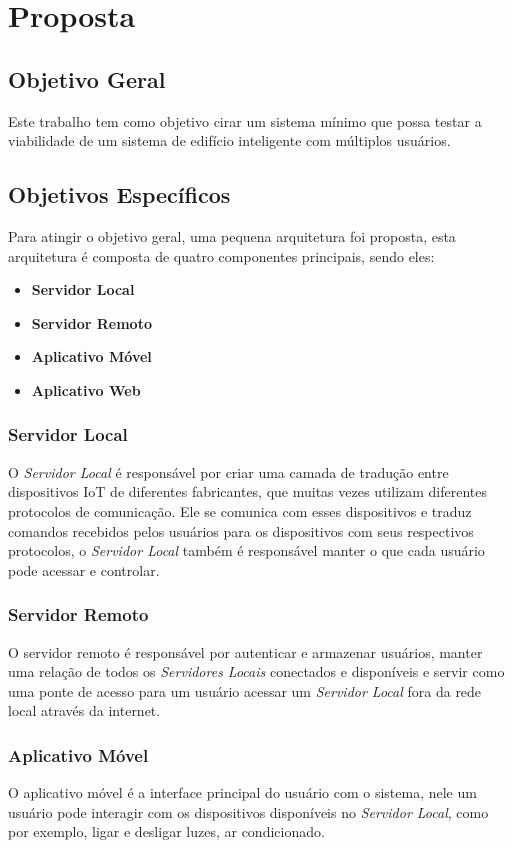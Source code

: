 \section{Proposta}
\label{sec:proposta}

\subsection{Objetivo Geral}
Este trabalho tem como objetivo cirar um sistema mínimo que possa testar
a viabilidade de um sistema de edifício inteligente com múltiplos usuários.

\subsection{Objetivos Específicos}
Para atingir o objetivo geral, uma pequena arquitetura foi proposta, esta 
arquitetura é composta de quatro componentes principais, sendo eles:
\begin{itemize}
    \item \textbf{Servidor Local}
    \item \textbf{Servidor Remoto}
    \item \textbf{Aplicativo Móvel}
    \item \textbf{Aplicativo Web}
\end{itemize}

\subsubsection{Servidor Local} 
O \emph{Servidor Local} é responsável por criar uma
camada de tradução entre dispositivos IoT de diferentes fabricantes, que muitas
vezes utilizam diferentes protocolos de comunicação. Ele se comunica com esses
dispositivos e traduz comandos recebidos pelos usuários para os dispositivos
com seus respectivos protocolos, o \emph{Servidor Local} também é responsável manter
o que cada usuário pode acessar e controlar.

\subsubsection{Servidor Remoto}
O servidor remoto é responsável por autenticar e armazenar usuários, manter uma
relação de todos os \emph{Servidores Locais} conectados e disponíveis e servir como uma
ponte de acesso para um usuário acessar um \emph{Servidor Local} fora da rede local através
da internet.

\subsubsection{Aplicativo Móvel}
O aplicativo móvel é a interface principal do usuário com o sistema, nele um usuário pode interagir
com os dispositivos disponíveis no \emph{Servidor Local}, como por exemplo, ligar e desligar luzes, ar condicionado.

